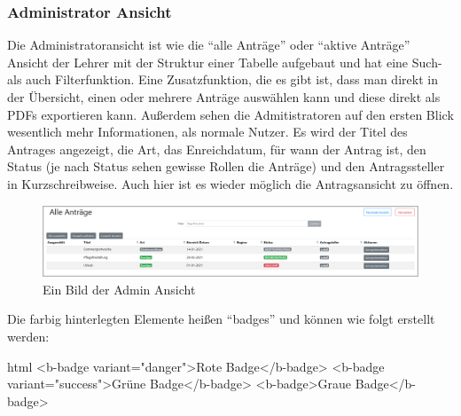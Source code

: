\subsubsection{Administrator Ansicht}
Die Administratoransicht ist wie die \enquote{alle Anträge} oder \enquote{aktive Anträge} Ansicht der Lehrer mit der Struktur einer Tabelle aufgebaut und hat eine Such- als auch Filterfunktion. Eine Zusatzfunktion, die es gibt ist, dass man direkt in der Übersicht, einen oder mehrere Anträge auswählen kann und diese direkt als PDFs exportieren kann. Außerdem sehen die Admitistratoren auf den ersten Blick wesentlich mehr Informationen, als normale Nutzer. Es wird der Titel des Antrages angezeigt, die Art, das Enreichdatum, für wann der Antrag ist, den Status (je nach Status sehen gewisse Rollen die Anträge) und den Antragssteller in Kurzschreibweise. Auch hier ist es wieder möglich die Antragsansicht zu öffnen.
\begin{figure}[H]
	\centering
	\includegraphics[width=1\linewidth]{images/website/admin}
	\caption[Aktiv]{Ein Bild der Admin Ansicht}
	\label{fig:adminview}
\end{figure}
Die farbig hinterlegten Elemente heißen \enquote{badges} und können wie folgt erstellt werden:
\begin{code}{html}
	<b-badge variant="danger">Rote Badge</b-badge>
	<b-badge variant="success">Grüne Badge</b-badge>
	<b-badge>Graue Badge</b-badge>
\end{code}
	\label{list:badgebsp} ~\\
~\\

\newpage
